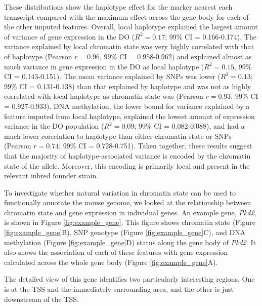 \documentclass[
  11pt,
]{article}
\begin{document}
These distributions show the haplotype effect for the marker nearest
each transcript compared with the maximum effect across the gene body
for each of the other imputed features. Overall, local haplotype
explained the largest amount of variance of gene expression in the DO
(\(R^2 = 0.17\); 99\% CI = 0.166-0.174). The variance explained by local
chromatin state was very highly correlated with that of haplotype
(Pearson \(r = 0.96\), 99\% CI = 0.958-0.962) and explained almost as
much variance in gene expression in the DO as local haplotype
(\(R^2 = 0.15\), 99\% CI = 0.143-0.151). The mean variance explained by
SNPs was lower (\(R^2 = 0.13\); 99\% CI = 0.131-0.138) than that
explained by haplotype and was not as highly correlated with local
haplotype as chromatin state was (Pearson \(r = 0.93\); 99\% CI =
0.927-0.933). DNA methylation, the lower bound for variance explained by
a feature imputed from local haplotype, explained the lowest amount of
expression variance in the DO population (\(R^2 = 0.09\); 99\% CI =
0.082-0.088), and had a much lower correlation to haplotype than either
chromatin state or SNPs (Pearson \(r = 0.74\); 99\% CI = 0.728-0.751).
Taken together, these results suggest that the majority of
haplotype-associated variance is encoded by the chromatin state of the
allele. Moreover, this encoding is primarily local and present in the
relevant inbred founder strain.

To investigate whether natural variation in chromatin state can be used
to functionally annotate the mouse genome, we looked at the relationship
between chromatin state and gene expression in individual genes. An
example gene, \textit{Pkd2}, is shown in Figure \ref{fig:example_gene}.
This figure shows chromatin state (Figure \ref{fig:example_gene}B), SNP
genotype (Figure \ref{fig:example_gene}C), and DNA methylation (Figure
\ref{fig:example_gene}D) status along the gene body of \textit{Pkd2}. It
also shows the association of each of these features with gene
expression calculated across the whole gene body (Figure
\ref{fig:example_gene}A).

The detailed view of this gene identifies two particularly interesting
regions. One is at the TSS and the immediately surrounding area, and the
other is just downstream of the TSS.
\end{document}

